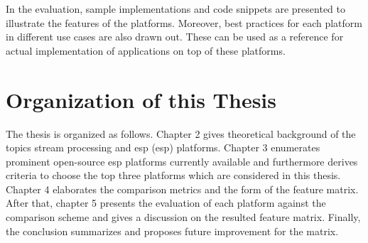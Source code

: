 In the evaluation, sample implementations and code snippets are presented to illustrate the features of the platforms. Moreover, best practices for each platform in different use cases are also drawn out. These can be used as a reference for actual implementation of applications on top of these platforms.

\section{Organization of this Thesis}
The thesis is organized as follows. Chapter 2 gives theoretical background of the topics stream processing and \acrlong{esp} (\acrshort{esp}) platforms. Chapter 3 enumerates prominent open-source \acrshort{esp} platforms currently available and furthermore derives criteria to choose the top three platforms which are considered in this thesis. Chapter 4 elaborates the comparison metrics and the form of the feature matrix. After that, chapter 5 presents the evaluation of each platform against the comparison scheme and gives a discussion on the resulted feature matrix. Finally, the conclusion summarizes and proposes future improvement for the matrix.

